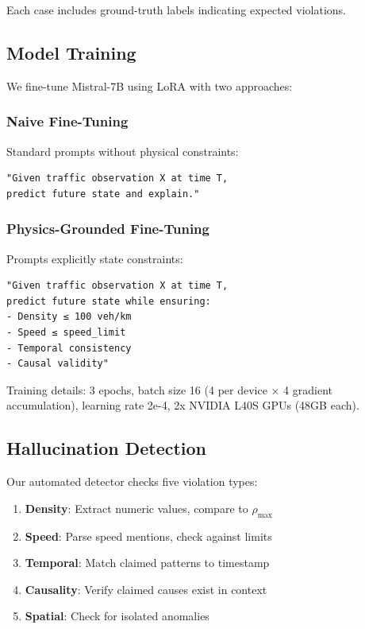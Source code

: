 \documentclass[conference]{IEEEtran}
\begin{document}
Each case includes ground-truth labels indicating expected violations.

\subsection{Model Training}

We fine-tune Mistral-7B \cite{jiang2023mistral} using LoRA \cite{hu2021lora} with two approaches:

\subsubsection{Naive Fine-Tuning}
Standard prompts without physical constraints:

\begin{verbatim}
"Given traffic observation X at time T,
predict future state and explain."
\end{verbatim}

\subsubsection{Physics-Grounded Fine-Tuning}
Prompts explicitly state constraints:

\begin{verbatim}
"Given traffic observation X at time T,
predict future state while ensuring:
- Density ≤ 100 veh/km
- Speed ≤ speed_limit
- Temporal consistency
- Causal validity"
\end{verbatim}

Training details: 3 epochs, batch size 16 (4 per device × 4 gradient accumulation), learning rate 2e-4, 2x NVIDIA L40S GPUs (48GB each).

\subsection{Hallucination Detection}

Our automated detector checks five violation types:

\begin{enumerate}
    \item \textbf{Density}: Extract numeric values, compare to $\rho_{\text{max}}$
    \item \textbf{Speed}: Parse speed mentions, check against limits
    \item \textbf{Temporal}: Match claimed patterns to timestamp
    \item \textbf{Causality}: Verify claimed causes exist in context
    \item \textbf{Spatial}: Check for isolated anomalies
\end{enumerate}
\end{document}

